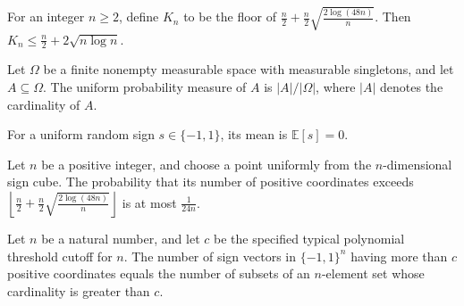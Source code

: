 \begin{theorem}
\label{FABL.typicalPolynomialThresholdCutoff_le}
\leanok
{}
For an integer $n\ge 2$, define $K_n$ to be the floor of $\frac n2+\frac
n2\sqrt{\frac{2\log(48n)}{n}}$. Then $K_n\le \frac n2+2\sqrt{n\log n}$.
\end{theorem}

\begin{theorem}
\label{FABL.measure_uniformPMF_real_eq_ncard_div_card}
\leanok
{}
Let $\Omega$ be a finite nonempty measurable space with measurable singletons, and let
$A\subseteq\Omega$. The uniform probability measure of $A$ is $|A|/|\Omega|$, where
$|A|$ denotes the cardinality of $A$.
\end{theorem}

\begin{theorem}
\label{FABL.expect_signValue_prescribedFourierSupport}
\leanok
{}
For a uniform random sign $s\in\{-1,1\}$, its mean is $\mathbb{E}[s]=0$.
\end{theorem}

\begin{theorem}
\label{FABL.measure_positiveCoordinateCount_gt_typicalCutoff_le}
\leanok
{}
Let $n$ be a positive integer, and choose a point uniformly from the $n$-dimensional
sign cube. The probability that its number of positive coordinates exceeds $\left\lfloor
\frac n2+\frac n2\sqrt{\frac{2\log(48n)}{n}}\right\rfloor$ is at most $\frac{1}{24n}$.
\end{theorem}

\begin{theorem}
\label{FABL.ncard_positiveCoordinateCount_gt_typicalCutoff}
\leanok
{}
Let $n$ be a natural number, and let $c$ be the specified typical polynomial threshold
cutoff for $n$. The number of sign vectors in $\{-1,1\}^n$ having more than $c$ positive
coordinates equals the number of subsets of an $n$-element set whose cardinality is
greater than $c$.
\end{theorem}

